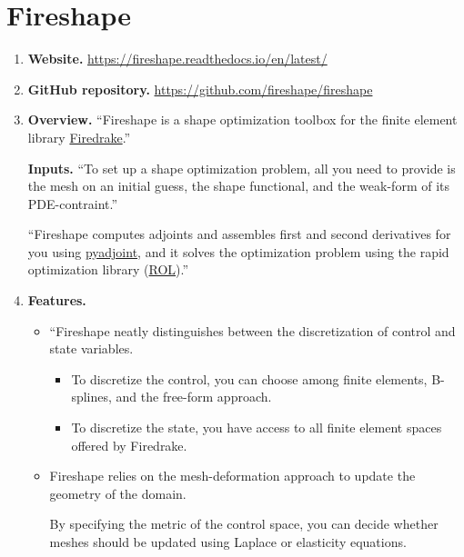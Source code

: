\documentclass[onsided]{book}
\numberwithin{equation}{section}
\begin{document}
\section{Fireshape}
\begin{enumerate}
    \item \textbf{Website.} \url{https://fireshape.readthedocs.io/en/latest/}
    \item \textbf{GitHub repository.} \url{https://github.com/fireshape/fireshape}
    \item \textbf{Overview.} ``Fireshape is a shape optimization toolbox for the finite element library \href{https://www.firedrakeproject.org/}{Firedrake}.''
    
    \textbf{Inputs.} ``To set up a shape optimization problem, all you need to provide is the mesh on an initial guess, the shape functional, and the weak-form of its PDE-contraint.''
    
    ``Fireshape computes adjoints and assembles first and second derivatives for you using \href{http://www.dolfin-adjoint.org/en/release/}{pyadjoint}, and it solves the optimization problem using the rapid optimization library (\href{https://trilinos.org/packages/rol/}{ROL}).''
    \item \textbf{Features.}
    \begin{itemize}
        \item ``Fireshape neatly distinguishes between the discretization of control and state variables.
        \begin{itemize}
            \item To discretize the control, you can choose among finite elements, B-splines, and the free-form approach.
            \item To discretize the state, you have access to all finite element spaces offered by Firedrake.
        \end{itemize}
        \item Fireshape relies on the mesh-deformation approach to update the geometry of the domain.
        
        By specifying the metric of the control space, you can decide whether meshes should be updated using Laplace or elasticity equations.
        

\end{itemize}
\end{enumerate}
\end{document}
